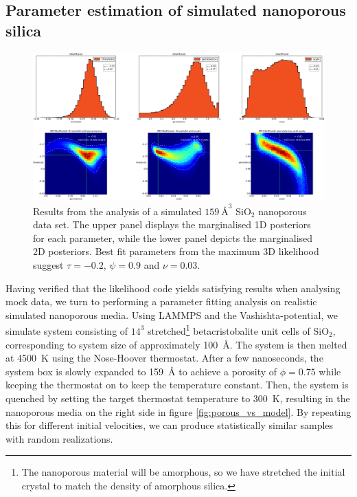 \documentclass[aps,pre,twocolumn,letterpaper,floatfix,showpacs]{revtex4}
\begin{document}
\subsection{Parameter estimation of simulated nanoporous silica}
\begin{figure}
\includegraphics[width=.99\textwidth]{fig7.png}
\caption{
Results from the analysis of a simulated $\SI{159} {\angstrom}^3$ SiO$_2$ nanoporous data set. The upper panel displays the marginalised 1D posteriors for each parameter, while the lower panel depicts the marginalised 2D posteriors. Best fit parameters from the maximum 3D likelihood suggest $\tau=-0.2$, $\psi=0.9$ and $\nu=0.03$.
}

\label{fig:porous_results1}
\end{figure}
Having verified that the likelihood code yields satisfying results when analysing mock data, we turn to 
performing a parameter fitting analysis on realistic simulated nanoporous media.
Using LAMMPS\cite{plimpton1995fast} and the Vashishta-potential\cite{vashishta1990interaction},
we simulate system consisting of $14^3$ stretched\footnote{The nanoporous material will be amorphous, so we have stretched the initial crystal to match the density of amorphous silica.} betacristobalite unit cells of SiO$_2$, corresponding
to system size of approximately \SI{100}{\angstrom}. 
The system is then melted at \SI{4500}{\kelvin} using the Nose-Hoover thermostat.
After a few nanoseconds, the system box is slowly expanded to \SI{159}{\angstrom} to achieve a porosity of $\phi=0.75$ while keeping the thermostat on to keep the temperature constant.
Then, the system is quenched by setting the target thermostat temperature to \SI{300}{\kelvin},
resulting in the nanoporous media on the right side in figure \ref{fig:porous_vs_model}. 
By repeating this for different initial velocities, we can produce statistically similar samples with random realizations. 
\end{document}
